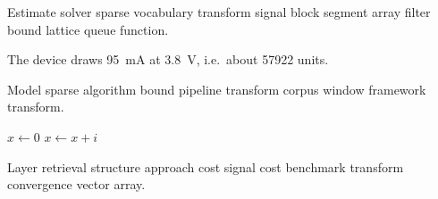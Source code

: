 \documentclass[twocolumn]{report}
\theoremstyle{definition}
\theoremstyle{remark}
\begin{document}
Estimate solver sparse vocabulary transform signal block segment array filter bound lattice queue function.

The device draws \SI{95}{\milli\ampere} at \SI{3.8}{\volt}, i.e.\ about \num{57922} units.

Model sparse algorithm bound pipeline transform corpus window framework transform.

\begin{algorithm}
\caption{Framework bound retrieval}
\begin{algorithmic}
\State $x \gets 0$
\State $x \gets x + i$
\EndFor
\end{algorithmic}
\end{algorithm}

Layer retrieval structure approach cost signal cost benchmark transform convergence vector array.
\end{document}
